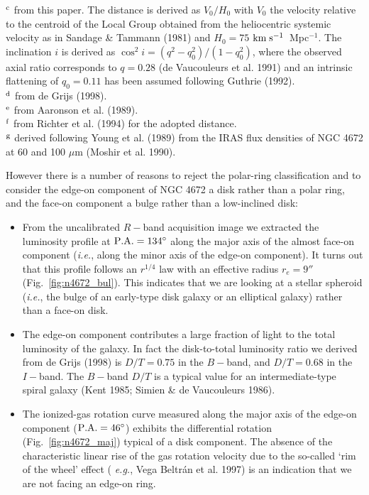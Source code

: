 \documentclass[twocolumns]{aa}
\def\kms{$\rm km\;s^{-1}$}
\def\dg{^\circ}
\begin{document}
\begin{table}[ht]
\begin{center}
\begin{minipage}{8cm}
$^{\rm c}$ from this paper. The distance is derived as $V_0/H_0$ with
$V_0$ the velocity relative to the centroid of the Local Group
obtained from the heliocentric systemic velocity as in Sandage \&
Tammann (1981) and $H_0 = 75$ \kms\ Mpc$^{-1}$. The inclination $i$ is
derived as $\cos ^{2} i = (q^2-q_0^2)/(1-q_0^2)$, where the observed
axial ratio corresponds to $q=0.28$ (de Vaucouleurs et al. 1991) and
an intrinsic flattening of $q_0 = 0.11$ has been assumed following
Guthrie (1992).\\
$^{\rm d}$ from de Grijs (1998).\\
$^{\rm e}$ from Aaronson et al. (1989).\\
$^{\rm f}$ from Richter et al. (1994) for the adopted distance.\\
$^{\rm g}$ derived following Young et al. (1989) from the 
IRAS flux densities of NGC 4672 at 60 and 100 $\mu$m (Moshir et al. 1990).\\
\end{minipage}
\end{center}
\label{tab:n4672_properties}
\end{table}


However there is a number of reasons to reject the polar-ring
classification and to consider the edge-on component of NGC 4672 a
disk rather than a polar ring, and the face-on component a bulge
rather than a low-inclined disk:

\begin{itemize}

\item[{\it (i)\/}] From the uncalibrated $R-$band acquisition image we
extracted the luminosity profile at $\rm P.A.=134\dg$ along the major
axis of the almost face-on component ({\it i.e.\/}, along the
minor axis of the edge-on component). It turns out that this profile
follows an $r^{1/4}$ law with an effective radius $r_e = 9''$
(Fig.~\ref{fig:n4672_bul}). This indicates that we are looking at a
stellar spheroid ({\it i.e.\/}, the bulge of an early-type disk galaxy
or an elliptical galaxy) rather than a face-on disk.

\item[{\it (ii)\/}] The edge-on component contributes a large fraction
of light to the total luminosity of the galaxy. In fact the
disk-to-total luminosity ratio we derived from de Grijs (1998) is
$D/T=0.75$ in the $B-$band, and $D/T=0.68$ in the
$I-$band.  The $B-$band $D/T$ is a typical value for an
intermediate-type spiral galaxy (Kent 1985; Simien \& de Vaucouleurs
1986).

\item[{\it (iii)\/}] The ionized-gas rotation curve measured along the
major axis of the edge-on component ($\rm P.A.=46\dg$) exhibits the
differential rotation (Fig.~\ref{fig:n4672_maj}) typical of a disk
component.  The absence of the characteristic linear rise of the gas
rotation velocity due to the so-called `rim of the wheel' effect ({\it
e.g.}, Vega Beltr\'an et al. 1997) is an indication that we are not
facing an edge-on ring.


\end{itemize}
\end{document}
